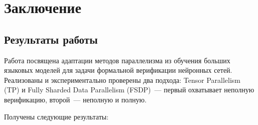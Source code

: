 \section{Заключение}

\subsection{Результаты работы}

Работа посвящена адаптации методов параллелизма из обучения
больших языковых моделей для задачи формальной верификации нейронных
сетей. Реализованы и экспериментально проверены два подхода:
Tensor Parallelism (TP) и Fully Sharded Data Parallelism (FSDP)~---
первый охватывает неполную верификацию, второй~--- неполную и полную.

Получены следующие результаты:

